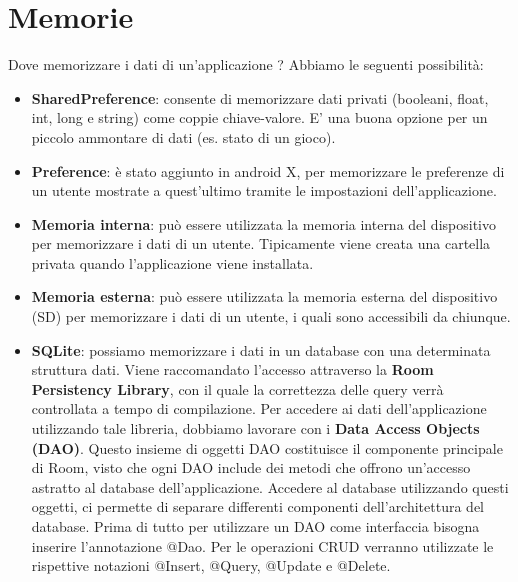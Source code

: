 \chapter{Memorie}
Dove memorizzare i dati di un'applicazione ? Abbiamo le seguenti possibilità:
\begin{itemize}
\item \textbf{SharedPreference}: consente di memorizzare dati privati (booleani, float, int, long e string) come coppie chiave-valore. E' una buona opzione per un piccolo ammontare di dati (es. stato di un gioco).
\item \textbf{Preference}: è stato aggiunto in android X, per memorizzare le preferenze di un utente mostrate a quest'ultimo tramite le impostazioni dell'applicazione.
\item \textbf{Memoria interna}: può essere utilizzata la memoria interna del dispositivo per memorizzare i dati di un utente. Tipicamente viene creata una cartella privata quando l'applicazione viene installata.
\item \textbf{Memoria esterna}: può essere utilizzata la memoria esterna del dispositivo (SD) per memorizzare i dati di un utente, i quali sono accessibili da chiunque.
\item \textbf{SQLite}: possiamo memorizzare i dati in un database con una determinata struttura dati. Viene raccomandato l'accesso attraverso la \textbf{Room Persistency Library}, con il quale la correttezza delle query verrà controllata a tempo di compilazione. Per accedere ai dati dell'applicazione utilizzando tale libreria, dobbiamo lavorare con i \textbf{Data Access Objects (DAO)}. Questo insieme di oggetti DAO costituisce il componente principale di Room, visto che ogni DAO include dei metodi che offrono un'accesso astratto al database dell'applicazione. Accedere al database utilizzando questi oggetti, ci permette di separare differenti componenti dell'architettura del database. Prima di tutto per utilizzare un DAO come interfaccia bisogna inserire l'annotazione @Dao. Per le operazioni CRUD verranno utilizzate le rispettive notazioni @Insert, @Query, @Update e @Delete.

\end{itemize}
